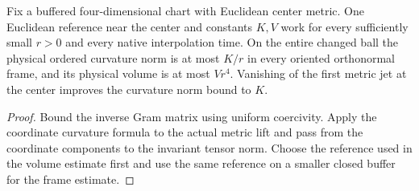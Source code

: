 \begin{proposition}
\label{prop:ed46-native-frame}
\leanok
Fix a buffered four-dimensional chart with Euclidean center metric.
One Euclidean reference near the center and constants $K,V$ work for
every sufficiently small $r>0$ and every native interpolation time.
On the entire changed ball the physical ordered curvature norm is at most
$K/r$ in every oriented orthonormal frame, and its physical volume is at
most $Vr^4$. Vanishing of the first metric jet at the center improves
the curvature norm bound to $K$.
\end{proposition}
\begin{proof}
\leanok
Bound the inverse Gram matrix using uniform coercivity. Apply the
coordinate curvature formula to the actual metric lift and pass from
the coordinate components to the invariant tensor norm. Choose the
reference used in the volume estimate first and use the same reference
on a smaller closed buffer for the frame estimate.
\end{proof}

